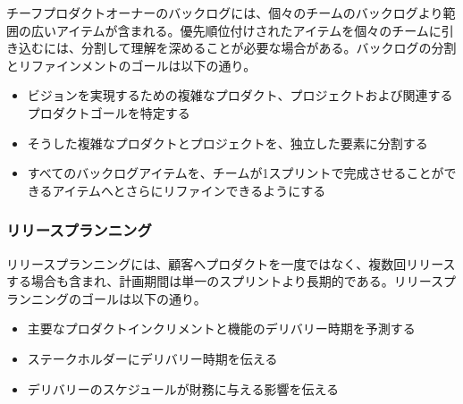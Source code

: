 \documentclass[12pt,a4paper,parskip=full]{scrartcl}
\begin{document}

チーフプロダクトオーナーのバックログには、個々のチームのバックログより範囲の広いアイテムが含まれる。優先順位付けされたアイテムを個々のチームに引き込むには、分割して理解を深めることが必要な場合がある。バックログの分割とリファインメントのゴールは以下の通り。

\begin{itemize}
\itemsep1pt\parskip0pt

\item
ビジョンを実現するための複雑なプロダクト、プロジェクトおよび関連するプロダクトゴールを特定する
\item
そうした複雑なプロダクトとプロジェクトを、独立した要素に分割する
\item
すべてのバックログアイテムを、チームが1スプリントで完成させることができるアイテムへとさらにリファインできるようにする
\end{itemize}

\subsubsection{リリースプランニング}\label{Release-planning}

リリースプランニングには、顧客へプロダクトを一度ではなく、複数回リリースする場合も含まれ、計画期間は単一のスプリントより長期的である。リリースプランニングのゴールは以下の通り。

\begin{itemize}
\itemsep1pt\parskip0pt

\item
主要なプロダクトインクリメントと機能のデリバリー時期を予測する
\item
ステークホルダーにデリバリー時期を伝える
\item
デリバリーのスケジュールが財務に与える影響を伝える
\end{itemize}
\end{document}
